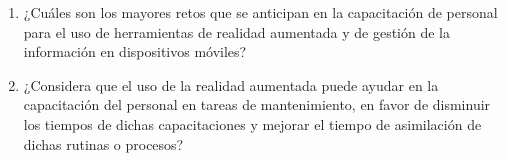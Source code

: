 \begin{enumerate}[leftmargin=*]
    \item ¿Cuáles son los mayores retos que se anticipan en la capacitación de personal para el uso de herramientas de realidad aumentada y de gestión de la información en dispositivos móviles?

    \item ¿Considera que el uso de la realidad aumentada puede ayudar en la capacitación del personal en tareas de mantenimiento, en favor de disminuir los tiempos de dichas capacitaciones y mejorar el tiempo de asimilación de dichas rutinas o procesos?
\end{enumerate}